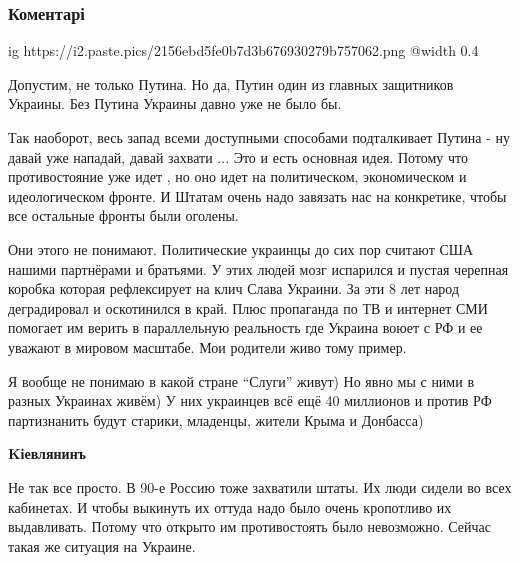  
 
 
 
 
\subsubsection{Коментарі}
\label{sec:08_12_2021.tg.tkachev_jurij.1.vtorzhenie_putin_usa.cmt}

\ifcmt
  ig https://i2.paste.pics/2156ebd5fe0b7d3b676930279b757062.png
  @width 0.4
\fi

\begin{itemize} %

Допустим, не только Путина. Но да, Путин один из главных защитников Украины.
Без Путина Украины давно уже не было бы.


Так наоборот, весь запад всеми доступными способами подталкивает Путина - ну
давай уже нападай, давай захвати ... Это и есть основная идея. Потому что
противостояние уже идет , но оно идет на политическом, экономическом  и
идеологическом фронте. И Штатам очень надо завязать нас на конкретике, чтобы
все остальные фронты были оголены.


Они этого не понимают. Политические украинцы до сих пор считают США нашими
партнёрами и братьями. У этих людей мозг испарился и пустая черепная коробка
которая рефлексирует на клич Слава Украини. За эти 8 лет народ деградировал и
оскотинился в край. Плюс пропаганда по ТВ и интернет СМИ помогает им верить в
параллельную реальность где Украина воюет с РФ и ее уважают в мировом масштабе.
Мои родители живо тому пример.


Я вообще не понимаю в какой стране \enquote{Слуги}  живут) Но явно мы с ними в разных
Украинах живём) У них украинцев всё ещё 40 миллионов и против РФ партизнанить
будут старики, младенцы, жители Крыма и Донбасса)

\textbf{Kіевлянинъ}

Не так все просто. В 90-е Россию тоже захватили штаты. Их люди сидели во всех
кабинетах. И чтобы выкинуть их оттуда надо было очень кропотливо их
выдавливать. Потому что открыто им противостоять было невозможно. Сейчас такая
же ситуация на Украине.


\end{itemize}
